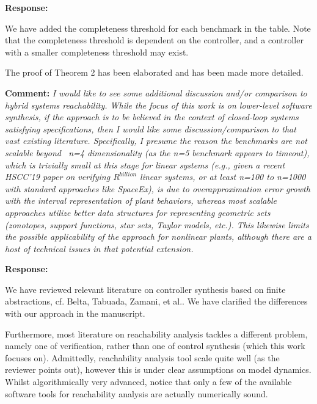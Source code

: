 \documentclass{article}
\begin{document}
\vspace{1em}

{\bf Response: }

We have added the completeness threshold for each benchmark in the table. Note that the completeness threshold is dependent on the controller, 
and a controller with a smaller completeness threshold may exist. 

The proof of Theorem 2 has been elaborated and has been made more detailed. 


\vspace{2em}

{\bf Comment: }
{\itshape I would like to see some additional discussion and/or comparison to hybrid systems reachability. While the focus of this work is on
lower-level
software synthesis, if the approach is to be believed in the context of closed-loop systems satisfying specifications, then I would like some
discussion/comparison to that vast existing literature. Specifically, I presume the reason the benchmarks are not scalable beyond ~n=4 dimensionality
(as the n=5 benchmark appears to timeout), which is trivially small at this stage for linear systems (e.g., given a recent HSCC'19 paper on verifying
$R^{billion}$ linear systems, or at least n=100 to n=1000 with standard approaches like SpaceEx), is due to overapproximation error growth with the
interval representation of plant behaviors, whereas most scalable approaches utilize better data structures for representing geometric sets
(zonotopes, support functions, star sets, Taylor models, etc.). This likewise limits the possible applicability of the
approach for nonlinear plants, although there are a host of technical issues in that potential extension. }

\vspace{1em}
{\bf Response: }

We have reviewed relevant literature on controller synthesis based on finite abstractions, cf. Belta, Tabuada, Zamani, et al.. We have clarified the differences with our approach in the manuscript. 

Furthermore, most literature on reachability analysis tackles a different problem, namely one of verification, rather than one of control synthesis (which this work
focuses on). Admittedly, reachability analysis tool scale quite well (as the reviewer points out), however this is under clear assumptions on model dynamics. 
Whilst algorithmically very advanced, notice that only a few of the available software tools for reachability analysis are actually numerically sound. 
\end{document}
